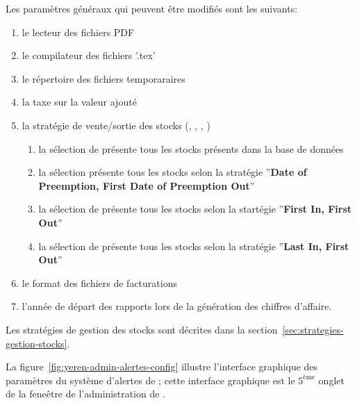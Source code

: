 Les param\`etres g\'en\'eraux qui peuvent \^etre
modifi\'es sont les suivants:
\begin{enumerate}[1)]
	\item le lecteur des fichiers PDF
	\item le compilateur des fichiers '.tex'
	\item le r\'epertoire des fichiers temporaraires
	\item la taxe sur la valeur ajout\'e
	\item la strat\'egie de vente/sortie des stocks (\cmup, \dpfdpo, \fifo, \lifo)
		\begin{enumerate}[1)]
			\item la s\'election de \cmup pr\'esente tous les
				stocks pr\'esents dans la base de donn\'ees \index{\cmup}
			\item la s\'election \dpfdpo pr\'esente tous les
				stocks selon la strat\'egie ''\textbf{Date of Preemption,
				First Date of Preemption Out}'' \index{\dpfdpo}				
			\item la s\'election de \fifo pr\'esente tous les
				stocks selon la start\'egie ''\textbf{First In, First Out}''
				\index{\fifo}
			\item la s\'election de \lifo pr\'esente tous les
				stocks selon la strat\'egie ''\textbf{Last In, First Out}''
				\index{\lifo}
		\end{enumerate}
	\item le format des fichiers de facturations
	\item l'ann\'ee de d\'epart des rapports lors de la
			g\'en\'eration des chiffres d'affaire.\\
\end{enumerate}

Les strat\'egies de gestion des stocks sont d\'ecrites
dans la section~\ref{sec:strategies-gestion-stocks}.


\newpage
{}

La figure~\ref{fig:yeren-admin-alertes-config} illustre
l'interface graphique des param\`etres du syst\`eme d'alertes
de \yeroth; cette interface graphique est le $5^{\text{\`eme}}$
onglet de la fene\^etre de l'administration de \yeroth.

